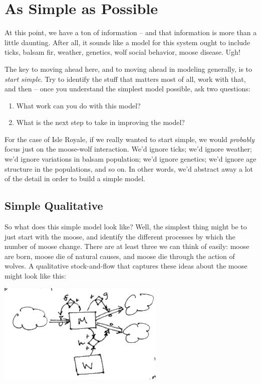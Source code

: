 \section{As Simple as Possible}

At this point, we have a ton of information -- and that information is more than a little daunting.  After all, it sounds like a model for this system ought to include ticks, balsam fir, weather, genetics, wolf social behavior, moose disease.  Ugh!

The key to moving ahead here, and to moving ahead in modeling generally, is to {\em start simple}.  Try to identify the stuff that matters most of all, work with that, and then -- once you understand the simplest model possible, ask two questions:
\begin{enumerate}
\item What work can you do with this model?
\item What is the next step to take in improving the model?
\end{enumerate}

For the case of Isle Royale, if we really wanted to start simple, we would {\it probably} focus just on the moose-wolf interaction.  We'd ignore ticks; we'd ignore weather; we'd ignore variations in balsam population; we'd ignore genetics; we'd ignore age structure in the populations, and so on.  In other words, we'd abstract away a lot of the detail in order to build a simple model.

\subsection{Simple Qualitative}
So what does this simple model look like?  Well, the simplest thing might be to just start with the moose, and identify the different processes by which the number of moose change.  There are at least three we can think of easily:  moose are born, moose die of natural causes, and moose die through the action of wolves.  A qualitative stock-and-flow that captures these ideas about the moose might look like this:

\includegraphics[width=8cm]{figs/QualitativeMooseStockAndFlow}

